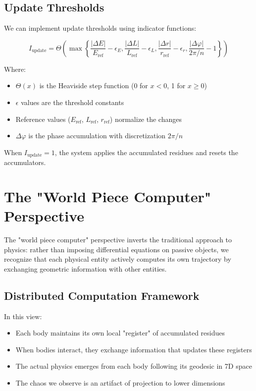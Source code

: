 \documentclass{article}
\begin{document}
\subsection{Update Thresholds}

We can implement update thresholds using indicator functions:

\begin{equation}
I_{\text{update}} = \Theta\left(\max\left\{\frac{|\Delta E|}{E_{\text{ref}}} - \epsilon_E, \frac{|\Delta L|}{L_{\text{ref}}} - \epsilon_L, \frac{|\Delta r|}{r_{\text{ref}}} - \epsilon_r, \frac{|\Delta \varphi|}{2\pi/n} - 1\right\}\right)
\end{equation}

Where:
\begin{itemize}
\item $\Theta(x)$ is the Heaviside step function (0 for $x < 0$, 1 for $x \geq 0$)
\item $\epsilon$ values are the threshold constants
\item Reference values ($E_{\text{ref}}$, $L_{\text{ref}}$, $r_{\text{ref}}$) normalize the changes
\item $\Delta\varphi$ is the phase accumulation with discretization $2\pi/n$
\end{itemize}

When $I_{\text{update}} = 1$, the system applies the accumulated residues and resets the accumulators.

\section{The "World Piece Computer" Perspective}

The "world piece computer" perspective inverts the traditional approach to physics: rather than imposing differential equations on passive objects, we recognize that each physical entity actively computes its own trajectory by exchanging geometric information with other entities.

\subsection{Distributed Computation Framework}

In this view:
\begin{itemize}
\item Each body maintains its own local "register" of accumulated residues
\item When bodies interact, they exchange information that updates these registers
\item The actual physics emerges from each body following its geodesic in 7D space
\item The chaos we observe is an artifact of projection to lower dimensions
\end{itemize}
\end{document}
